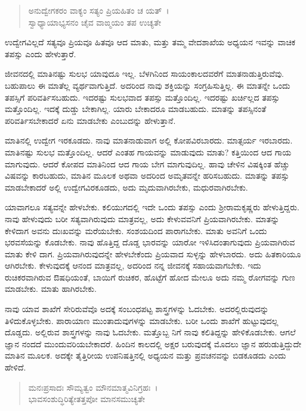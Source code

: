 \begin{verse}
ಅನುದ್ವೇಗಕರಂ ವಾಕ್ಯಂ ಸತ್ಯಂ ಪ್ರಿಯಹಿತಂ ಚ ಯತ್~।\\ಸ್ವಾಧ್ಯಾಯಾಭ್ಯಸನಂ ಚೈವ ವಾಙ್ಮಯಂ ತಪ ಉಚ್ಯತೇ 
\end{verse}

{\small ಉದ್ವೇಗವಿಲ್ಲದೆ ಸತ್ಯವೂ ಪ್ರಿಯವೂ ಹಿತವೂ ಆದ ಮಾತು, ಮತ್ತು ತಮ್ಮ ವೇದಶಾಖೆಯ ಅಧ್ಯಯನ ಇವನ್ನು ವಾಚಿಕ ತಪಸ್ಸು ಎಂದು ಹೇಳುತ್ತಾರೆ.}

ಜೀವನದಲ್ಲಿ ಮಾತಿನಷ್ಟು ಸುಲಭ ಯಾವುದೂ ಇಲ್ಲ. ಬೆಳಗಿನಿಂದ ಸಾಯಂಕಾಲದವರೆಗೆ ಮಾತನಾಡುತ್ತಿರುವೆವು. ಬಹುಪಾಲು ಈ ಮಾತೆಲ್ಲ ವ್ಯರ್ಥವಾಗುತ್ತಿದೆ. ಅದರಿಂದ ನಾವು ಶಕ್ತಿಯನ್ನು ಸಂಗ್ರಹಿಸುತ್ತಿಲ್ಲ. ಈ ಮಾತನ್ನೇ ಒಂದು ತಪಸ್ಸಿಗೆ ಪರಿವರ್ತಿಸಬಹುದು. ಇದರಷ್ಟು ಸುಲಭವಾದ ತಪಸ್ಸು ಮತ್ತೊಂದಿಲ್ಲ. ಇದರಷ್ಟು ಖರ್ಚಿಲ್ಲದ ತಪಸ್ಸು ಮತ್ತೊಂದಿಲ್ಲ. ಇದಕ್ಕೆ ದುಡ್ಡು ಬೇಕಾಗಿಲ್ಲ. ಯಾರು ಬೇಕಾದರೂ ಮಾಡಬಹುದು. ಮಾತನ್ನು ತಪಸ್ಸಿನಂತೆ ಪರಿವರ್ತಿಸಬೇಕಾದರೆ ಏನು ಮಾಡಬೇಕು ಎಂಬುದನ್ನು ಹೇಳುತ್ತಾನೆ.

ಮಾತಿನಲ್ಲಿ ಉದ್ವೇಗ ಇರಕೂಡದು. ನಾವು ಮಾತನಾಡುವಾಗ ಅಲ್ಲಿ ಕೋಪವಿರಬಾರದು. ಮಾತ್ಸರ್ಯ ಇರಬಾರದು. ಮಾತಿನಷ್ಟು ಸುಲಭ ಮತ್ತೊಂದಿಲ್ಲ. ಆದರೆ ಎಂತಹ ಗಾಯವನ್ನು ಮಾಡುವುದು ಮಾತು? ಕತ್ತಿಯಿಂದ ಆದ ಗಾಯ ಮಾಗುವುದು. ಆದರೆ ಕೋಪದ ಮಾತಿನಿಂದ ಆದ ಗಾಯ ಬೇಗ ಮಾಗುವುದಿಲ್ಲ. ಹಾವು ಚೇಳಿನ ವಿಷಕ್ಕಿಂತ ಹೆಚ್ಚು ವಿಷವನ್ನು ಕಾರಬಹುದು, ಮಾತಿನ ಮೂಲಕ ಅಥವಾ ಅದರಿಂದ ಅಮೃತವನ್ನೇ ಹರಿಸಬಹುದು. ಮಾತನ್ನು ತಪಸ್ಸು ಮಾಡಬೇಕಾದರೆ ಅಲ್ಲಿ ಉದ್ವೇಗವಿರಕೂಡದು, ಅದು ಮೃದುವಾಗಿರಬೇಕು, ಮಧುರವಾಗಿರಬೇಕು.

ಯಾವಾಗಲೂ ಸತ್ಯವನ್ನೇ ಹೇಳಬೇಕು. ಕಲಿಯುಗದಲ್ಲಿ ಇದೇ ಒಂದು ತಪಸ್ಸು ಎಂದು ಶ‍್ರೀರಾಮಕೃಷ್ಣರು ಹೇಳುತ್ತಿದ್ದರು. ನಾವು ಹೇಳುವುದು ಬರೀ ಸತ್ಯವಾಗಿರುವುದು ಮಾತ್ರವಲ್ಲ, ಅದು ಕೇಳುವವನಿಗೆ ಪ್ರಿಯವಾಗಿರಬೇಕು. ಮಾತನ್ನು ಕೇಳಿದಾಗ ಅವನು ದುಃಖವನ್ನು ಮರೆಯಬೇಕು. ಸಂಶಯದಿಂದ ಪಾರಾಗಬೇಕು. ಮಾತು ಅವನಿಗೆ ಒಂದು ಭರವಸೆಯನ್ನು ಕೊಡಬೇಕು. ನಾವು ಹೊತ್ತಿದ್ದ ದೊಡ್ಡ ಭಾರವನ್ನು ಯಾರೋ ಇಳಿಸಿದಂತಾಗುವುದು ಪ್ರಿಯವಾಗಿರುವ ಮಾತು ಕೇಳಿ ದಾಗ. ಪ್ರಿಯವಾಗಿರುವುದನ್ನೇ ಹೇಳಬೇಕೆಂದು ಪ್ರಿಯವಾದ ಸುಳ್ಳನ್ನು ಹೇಳಬಾರದು. ಅದು ಹಿತಕಾರಿಯೂ ಆಗಿರಬೇಕು. ಕೇಳುವುದಕ್ಕೆ ಆನಂದ ಮಾತ್ರವಲ್ಲ, ಅದರಿಂದ ನನ್ನ ಜೀವನಕ್ಕೆ ಸಹಾಯವಾಗಬೇಕು. ಇದು ರುಚಿಕರವಾಗಿರುವ ಔಷಧಿಯಂತೆ, ಬಾಯಿಗೆ ರುಚಿಕರ, ಹೊಟ್ಟೆಗೆ ಹೋದ ಮೇಲೂ ಅದು ನಮ್ಮ ರೋಗವನ್ನು ಗುಣ ಮಾಡಬೇಕು. ಮಾತು ಹಾಗಿರಬೇಕು.

ನಾವು ಯಾವ ಶಾಖೆಗೆ ಸೇರಿರುವೆವೊ ಅದಕ್ಕೆ ಸಂಬಂಧಪಟ್ಟ ಶಾಸ್ತ್ರಗಳನ್ನು ಓದಬೇಕು. ಅದರಲ್ಲಿರುವುದನ್ನು ತಿಳಿದುಕೊಳ್ಳಬೇಕು. ಪಾರಾಯಾಣ ಮುಂತಾದುವುಗಳನ್ನು ಮಾಡಬೇಕು. ಬರೀ ಒಂದು ಶಾಖೆಗೆ ಹುಟ್ಟುವುದಲ್ಲ ದೊಡ್ಡದು. ಅಲ್ಲಿರುವ ಶಾಸ್ತ್ರಗಳನ್ನು ನಾವು ಓದಬೇಕು. ಮತ್ತೊಬ್ಬ ನಿಗೆ ನಾವು ಕಲಿತಿದ್ದನ್ನು ಹೇಳಿಕೊಡಬೇಕು. ಆಗಲೆ ಜ್ಞಾನ ನಂದದೆ ಮುಂದುವರಿಯಬೇಕಾದರೆ. ಹಿಂದಿನ ಕಾಲದಲ್ಲಿ ಅಕ್ಷರ ಬರುವುದಕ್ಕೆ ಮೊದಲು ಜ್ಞಾನ ಹರುಡುತ್ತಿದ್ದುದೇ ಮಾತಿನ ಮೂಲಕ. ಅದಕ್ಕೇ ತೈತ್ತಿರೀಯ ಉಪನಿಷತ್ತಿನಲ್ಲಿ ಅಧ್ಯಯನ ಮತ್ತು ಪ್ರವಚನವನ್ನು ಬಿಡಕೂಡದು ಎಂದು ಹೇಳಿದೆ.

\begin{verse}
ಮನಃಪ್ರಸಾದಃ ಸೌಮ್ಯತ್ವಂ ಮೌನಮಾತ್ಮವಿನಿಗ್ರಹಃ~।\\ಭಾವಸಂಶುದ್ಧಿರಿತ್ಯೇತತ್ತಪೋ ಮಾನಸಮುಚ್ಯತೇ 
\end{verse}

